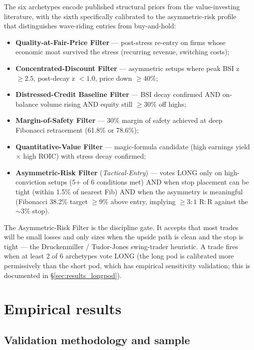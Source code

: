 \documentclass[11pt,a4paper]{article}
\begin{document}
The six archetypes encode published structural priors from the value-investing literature, with the sixth specifically calibrated to the asymmetric-risk profile that distinguishes wave-riding entries from buy-and-hold:
\begin{itemize}
\item \textbf{Quality-at-Fair-Price Filter} --- post-stress re-entry on firms whose economic moat survived the stress (recurring revenue, switching costs);
\item \textbf{Concentrated-Discount Filter} --- asymmetric setups where peak BSI z $\ge 2.5$, post-decay z $< 1.0$, price down $\ge 40\%$;
\item \textbf{Distressed-Credit Baseline Filter} --- BSI decay confirmed AND on-balance volume rising AND equity still $\ge 30\%$ off highs;
\item \textbf{Margin-of-Safety Filter} --- 30\% margin of safety achieved at deep Fibonacci retracement (61.8\% or 78.6\%);
\item \textbf{Quantitative-Value Filter} --- magic-formula candidate (high earnings yield $\times$ high ROIC) with stress decay confirmed;
\item \textbf{Asymmetric-Risk Filter} (\emph{Tactical-Entry}) --- votes LONG only on high-conviction setups (5+ of 6 conditions met) AND when stop placement can be tight (within 1.5\% of nearest Fib) AND when the asymmetry is meaningful (Fibonacci 38.2\% target $\ge 9\%$ above entry, implying $\ge 3{:}1$ R$:$R against the $\sim 3\%$ stop).
\end{itemize}
The Asymmetric-Risk Filter is the discipline gate. It accepts that most trades will be small losses and only sizes when the upside path is clean and the stop is tight --- the Druckenmiller / Tudor-Jones swing-trader heuristic. A trade fires when at least 2 of 6 archetypes vote LONG (the long pod is calibrated more permissively than the short pod, which has empirical sensitivity validation; this is documented in §\ref{sec:results_longpod}).

\section{Empirical results}\label{sec:results}

\subsection{Validation methodology and sample}\label{sec:valid_method}
\end{document}
